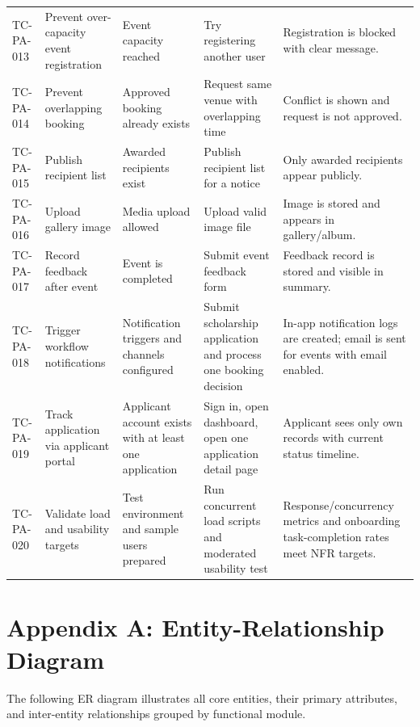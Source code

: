 \documentclass[12pt,a4paper]{article}
\begin{document}
\begin{longtable}{@{}L{1.5cm}L{2.6cm}L{2.7cm}L{3.1cm}L{4.5cm}@{}}
TC-PA-013 & Prevent over-capacity event registration & Event capacity reached & Try registering another user & Registration is blocked with clear message. \\
TC-PA-014 & Prevent overlapping booking & Approved booking already exists & Request same venue with overlapping time & Conflict is shown and request is not approved. \\
TC-PA-015 & Publish recipient list & Awarded recipients exist & Publish recipient list for a notice & Only awarded recipients appear publicly. \\
TC-PA-016 & Upload gallery image & Media upload allowed & Upload valid image file & Image is stored and appears in gallery/album. \\
TC-PA-017 & Record feedback after event & Event is completed & Submit event feedback form & Feedback record is stored and visible in summary. \\
TC-PA-018 & Trigger workflow notifications & Notification triggers and channels configured & Submit scholarship application and process one booking decision & In-app notification logs are created; email is sent for events with email enabled. \\
TC-PA-019 & Track application via applicant portal & Applicant account exists with at least one application & Sign in, open dashboard, open one application detail page & Applicant sees only own records with current status timeline. \\
TC-PA-020 & Validate load and usability targets & Test environment and sample users prepared & Run concurrent load scripts and moderated usability test & Response/concurrency metrics and onboarding task-completion rates meet NFR targets. \\
\bottomrule
\end{longtable}

\appendix

\newpage
\section{Appendix A: Entity-Relationship Diagram}
\label{app:erdiagram}

The following ER diagram illustrates all core entities, their primary attributes, and inter-entity relationships grouped by functional module.
\end{document}
